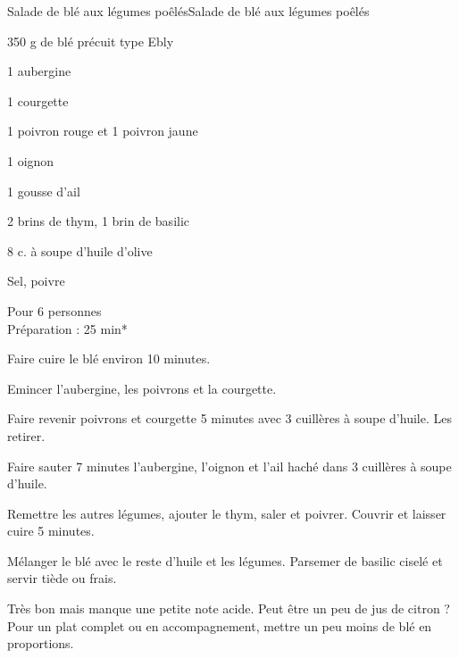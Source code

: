 \begin{recette}{Salade de bl\'e aux l\'egumes po\^el\'es}{Salade de bl\'e aux l\'egumes po\^el\'es}

\begin{ingredients}
 350 g de bl\'e pr\'ecuit type Ebly\par
1 aubergine\par
1 courgette\par
1 poivron rouge et 1 poivron jaune\par
1 oignon\par
1 gousse d'ail\par
2 brins de thym, 1 brin de basilic\par
8 c. \`a soupe d'huile d'olive\par
Sel, poivre
\end{ingredients}
\begin{infos}
Pour 6 personnes \\
Préparation : 25 min*
\end{infos}
\begin{etapes}
\item Faire cuire le bl\'e environ 10 minutes.
\item Emincer l'aubergine, les poivrons et la courgette. 
\item Faire revenir poivrons et courgette 5 minutes avec 3 cuill\`eres \`a soupe d'huile. Les retirer.
\item Faire sauter 7 minutes l'aubergine, l'oignon et l'ail hach\'e dans 3 cuill\`eres \`a soupe d'huile. 
\item Remettre les autres l\'egumes, ajouter le thym, saler et poivrer. Couvrir et laisser cuire 5 minutes.
\item M\'elanger le bl\'e avec le reste d'huile et les l\'egumes. Parsemer de basilic cisel\'e et servir ti\`ede ou frais.
\end{etapes}
\begin{conseils}
Tr\`es bon mais manque une petite note acide. Peut \^etre un peu de jus de citron ?
Pour un plat complet ou en accompagnement, mettre un peu moins de bl\'e en proportions.
\end{conseils}
\end{recette}